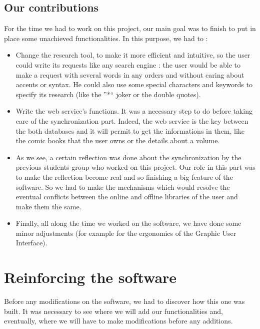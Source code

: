 \documentclass[11pt]{report} %
\begin{document}
\section{Our contributions}
For the time we had to work on this project, our main goal was to finish to put in place some unachieved functionalities. In this purpose, we had to :
\begin{itemize}
\item Change the research tool, to make it more efficient and intuitive, so the user could write its requests like any search engine : the user would be able to make a request with several words in any orders and without caring about accents or syntax. He could also use some special characters and keywords to specify its research (like the ''*`` joker or the double quotes).
\item Write the web service's functions. It was a necessary step to do before taking care of the synchronization part. Indeed, the web service is the key between the both databases and it will permit to get the informations in them, like the comic books that the user owns or the details about a volume.
\item As we see, a certain reflection was done about the synchronization by the previous students group who worked on this project. Our role in this part was to make the reflection become real and so finishing a big feature of the software. So we had to make the mechanisms which would resolve the eventual conflicts between the online and offline libraries of the user and make them the same.
\item Finally, all along the time we worked on the software, we have done some minor adjustments (for example for the ergonomics of the Graphic User Interface).

\end{itemize}


%
% 

\chapter{Reinforcing the software}
Before any modifications on the software, we had to discover how this one was built. It was necessary to see where we will add our functionalities and, eventually, where we will have to make modifications before any additions.
\end{document}
